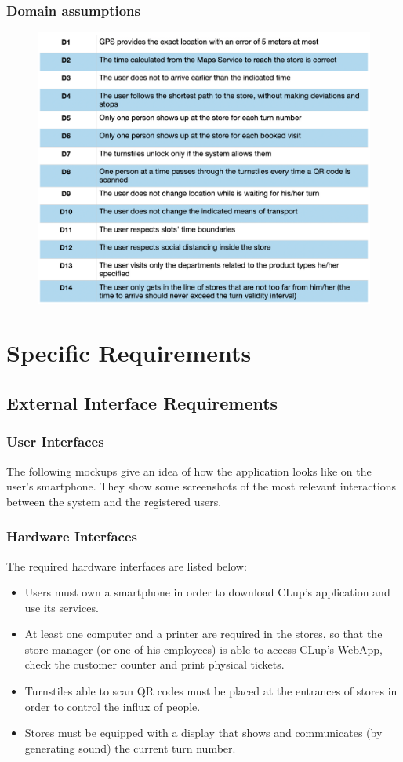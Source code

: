 \documentclass{article}
\begin{document}
\subsubsection{Domain assumptions}
\begin{figure}[H]
  \includegraphics[width=\linewidth]{Domains.png}
  
\end{figure}

\section{Specific Requirements}
\subsection{External Interface Requirements}
\subsubsection{User Interfaces}
The following mockups give an idea of how the application looks like on the user’s smartphone. They show some screenshots of the most relevant interactions between the system and the registered users.
\subsubsection{Hardware Interfaces}
The required hardware interfaces are listed below:
\begin{itemize}
\item Users must own a smartphone in order to download CLup’s application and use its services.
\item At least one computer and a printer are required in the stores, so that the store manager (or one of his employees) is able to access CLup’s WebApp, check the customer counter and print physical tickets.
\item Turnstiles able to scan QR codes must be placed at the entrances of stores in order to control the influx of people.
\item Stores must be equipped with a display that shows and communicates (by generating sound) the current turn number.
\end{itemize}
\end{document}
